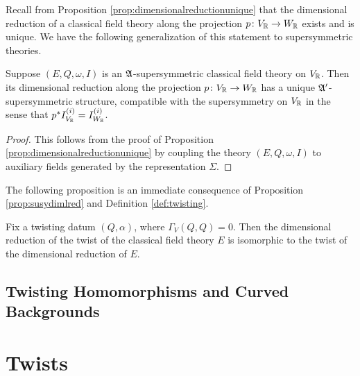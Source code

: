 \documentclass[10pt, oneside]{article}
\begin{document}
Recall from Proposition \ref{prop:dimensionalreductionunique} that the dimensional reduction of a classical field theory along the projection $p\colon V_\mathbb R\rightarrow W_\mathbb R$ exists and is unique. We have the following generalization of this statement to supersymmetric theories.

\begin{prop} \label{prop:susydimlred}
Suppose $(E, Q, \omega, I)$ is an $\mathfrak{A}$-supersymmetric classical field theory on $V_\mathbb R$. Then its dimensional reduction along the projection $p\colon V_\mathbb R\rightarrow W_\mathbb R$ has a unique $\mathfrak{A}'$-supersymmetric structure, compatible with the supersymmetry on $V_\mathbb R$ in the sense that $p^*I^{(i)}_{V_\mathbb R} = I^{(i)}_{W_\mathbb R}$.
\end{prop}

\begin{proof}
This follows from the proof of Proposition \ref{prop:dimensionalreductionunique} by coupling the theory $(E, Q, \omega, I)$ to auxiliary fields generated by the representation $\Sigma$.
\end{proof}

The following proposition is an immediate consequence of Proposition \ref{prop:susydimlred} and Definition \ref{def:twisting}.

\begin{prop}
Fix a twisting datum $(Q, \alpha)$, where $\Gamma_V(Q, Q) = 0$. Then the dimensional reduction of the twist of the classical field theory $E$ is isomorphic to the twist of the dimensional reduction of $E$.
\end{prop}

\subsection{Twisting Homomorphisms and Curved Backgrounds}


\section{Twists}
\end{document}
